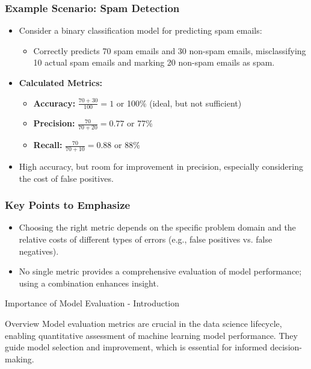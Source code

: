 \documentclass[aspectratio=169]{beamer}
\begin{document}
\begin{frame}[fragile]
    \frametitle{Example Scenario: Spam Detection}
    \begin{itemize}
        \item Consider a binary classification model for predicting spam emails:
        \begin{itemize}
            \item Correctly predicts 70 spam emails and 30 non-spam emails, misclassifying 10 actual spam emails and marking 20 non-spam emails as spam.
        \end{itemize}

        \item \textbf{Calculated Metrics:}
        \begin{itemize}
            \item \textbf{Accuracy:} \( \frac{70 + 30}{100} = 1 \) or 100\% (ideal, but not sufficient)
            \item \textbf{Precision:} \( \frac{70}{70 + 20} = 0.77 \) or 77\%
            \item \textbf{Recall:} \( \frac{70}{70 + 10} = 0.88 \) or 88\%
        \end{itemize}

        \item High accuracy, but room for improvement in precision, especially considering the cost of false positives.
    \end{itemize}
\end{frame}

\begin{frame}[fragile]
    \frametitle{Key Points to Emphasize}
    \begin{itemize}
        \item Choosing the right metric depends on the specific problem domain and the relative costs of different types of errors (e.g., false positives vs. false negatives).
        \item No single metric provides a comprehensive evaluation of model performance; using a combination enhances insight.
    \end{itemize}
\end{frame}

\begin{frame}[fragile]{Importance of Model Evaluation - Introduction}
    \begin{block}{Overview}
        Model evaluation metrics are crucial in the data science lifecycle, enabling quantitative assessment of machine learning model performance. They guide model selection and improvement, which is essential for informed decision-making.
    \end{block}
\end{frame}
\end{document}
